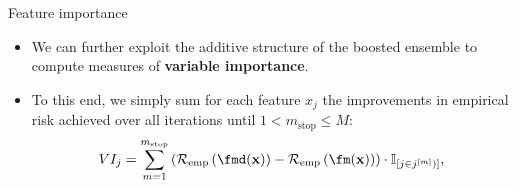 \documentclass[11pt,compress,t,notes=noshow, xcolor=table]{beamer}
\begin{document}
\begin{vbframe}{Feature importance}
\begin{itemize}
  \item We can further exploit the additive structure of the boosted ensemble to
  compute measures of \textbf{variable importance}.
  \item To this end, we simply sum for each feature $x_j$ the improvements in
  empirical risk achieved over all iterations until
  $1 < m_{\text{stop}} \leq M$:
    $$VI_j = \sum_{m = 1}^{m_{\text{stop}}} \left( \riske \left(
    \fmd(\xv) \right) - \riske \left(\fm(\xv)
    \right) \right) \cdot \I_{[j \in j^{[m]})]},$$
\end{itemize}

\end{vbframe}

%
%
%
%
%



\end{document}
